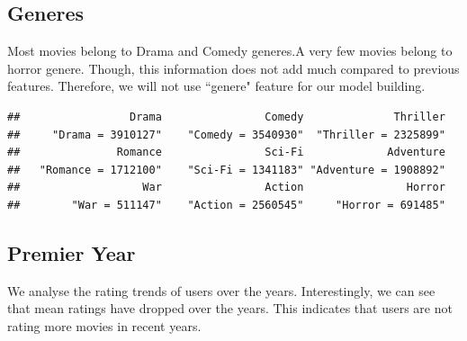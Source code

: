 \documentclass[]{article}
\newenvironment{Shaded}{\begin{snugshade}}{\end{snugshade}}
\newcommand{\ControlFlowTok}[1]{\textcolor[rgb]{0.13,0.29,0.53}{\textbf{#1}}}
\newcommand{\KeywordTok}[1]{\textcolor[rgb]{0.13,0.29,0.53}{\textbf{#1}}}
\newcommand{\NormalTok}[1]{#1}
\newcommand{\OperatorTok}[1]{\textcolor[rgb]{0.81,0.36,0.00}{\textbf{#1}}}
\newcommand{\StringTok}[1]{\textcolor[rgb]{0.31,0.60,0.02}{#1}}
\begin{document}
\subsection{Generes}
\label{sec:generes}

Most movies belong to Drama and Comedy generes.A very few movies belong
to horror genere. Though, this information does not add much compared to
previous features. Therefore, we will not use ``genere" feature for our
model building.

\begin{Shaded}
\end{Shaded}

\begin{verbatim}
##                 Drama                Comedy              Thriller 
##     "Drama = 3910127"    "Comedy = 3540930"  "Thriller = 2325899" 
##               Romance                Sci-Fi             Adventure 
##   "Romance = 1712100"    "Sci-Fi = 1341183" "Adventure = 1908892" 
##                   War                Action                Horror 
##        "War = 511147"    "Action = 2560545"     "Horror = 691485"
\end{verbatim}

\subsection{Premier Year}
\label{sec:pyear}

We analyse the rating trends of users over the years. Interestingly, we
can see that mean ratings have dropped over the years. This indicates
that users are not rating more movies in recent years.
\end{document}
